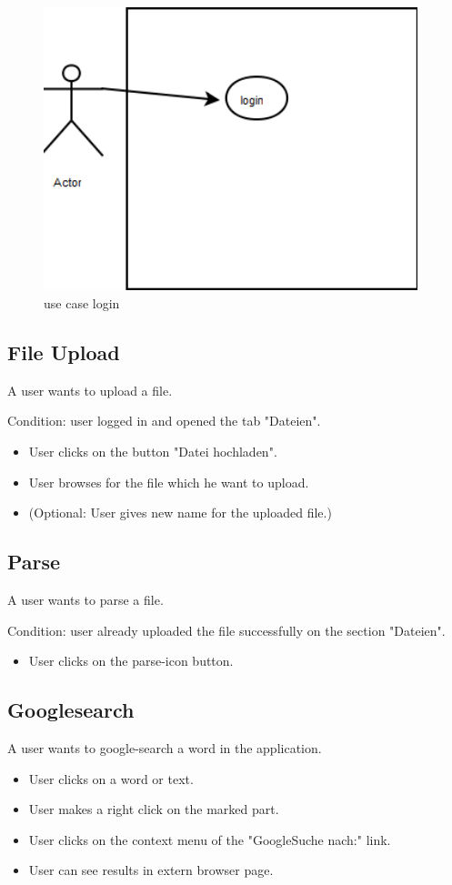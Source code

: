 \begin{figure}[!ht]
  \centering
    \includegraphics[width=0.97\textwidth]{images/use_cases/login.png}
  \caption{use case login}
  \label{fig:use case login}
\end{figure}

\subsection{File Upload}
A user wants to upload a file.

Condition: user logged in and opened the tab "Dateien".

\begin{itemize}
\item User clicks on the button "Datei hochladen".
\item User browses for the file which he want to upload.
\item (Optional: User gives new name for the uploaded file.)
\end{itemize}

\subsection{Parse}
A user wants to parse a file.

Condition: user already uploaded the file successfully on the section "Dateien".

\begin{itemize}
\item User clicks on the parse-icon button.
\end{itemize}

\subsection{Googlesearch}
A user wants to google-search a word in the application.

\begin{itemize}
\item User clicks on a word or text.
\item User makes a right click on the marked part.
\item User clicks on the context menu of the  "GoogleSuche nach:" link.
\item User can see results in extern browser page.
\end{itemize}